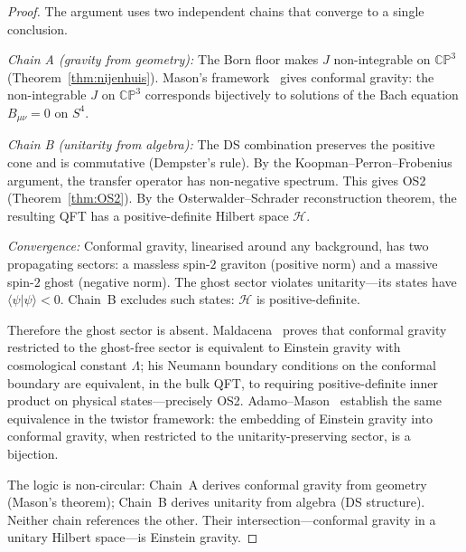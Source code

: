 \documentclass[11pt,a4paper]{article}
\theoremstyle{definition}
\theoremstyle{remark}
\newcommand{\CP}{\mathbb{CP}}
\begin{document}
\begin{proof}
The argument uses two independent chains that converge to a single conclusion.

\emph{Chain A (gravity from geometry):} The Born floor makes $J$ non-integrable on $\CP^3$ (Theorem~\ref{thm:nijenhuis}). Mason's framework~\cite{Mason2005} gives conformal gravity: the non-integrable $J$ on $\CP^3$ corresponds bijectively to solutions of the Bach equation $B_{\mu\nu}=0$ on $S^4$.

\emph{Chain B (unitarity from algebra):} The DS combination preserves the positive cone and is commutative (Dempster's rule). By the Koopman--Perron--Frobenius argument, the transfer operator has non-negative spectrum. This gives OS2 (Theorem~\ref{thm:OS2}). By the Osterwalder--Schrader reconstruction theorem, the resulting QFT has a positive-definite Hilbert space $\mathcal{H}$.

\emph{Convergence:} Conformal gravity, linearised around any background, has two propagating sectors: a massless spin-$2$ graviton (positive norm) and a massive spin-$2$ ghost (negative norm). The ghost sector violates unitarity---its states have $\langle\psi|\psi\rangle<0$. Chain~B excludes such states: $\mathcal{H}$ is positive-definite.

Therefore the ghost sector is absent. Maldacena~\cite{Maldacena2011} proves that conformal gravity restricted to the ghost-free sector is equivalent to Einstein gravity with cosmological constant $\Lambda$; his Neumann boundary conditions on the conformal boundary are equivalent, in the bulk QFT, to requiring positive-definite inner product on physical states---precisely OS2. Adamo--Mason~\cite{AdamoMason2014} establish the same equivalence in the twistor framework: the embedding of Einstein gravity into conformal gravity, when restricted to the unitarity-preserving sector, is a bijection.

The logic is non-circular: Chain~A derives conformal gravity from geometry (Mason's theorem); Chain~B derives unitarity from algebra (DS structure). Neither chain references the other. Their intersection---conformal gravity in a unitary Hilbert space---is Einstein gravity.
\end{proof}
\end{document}

